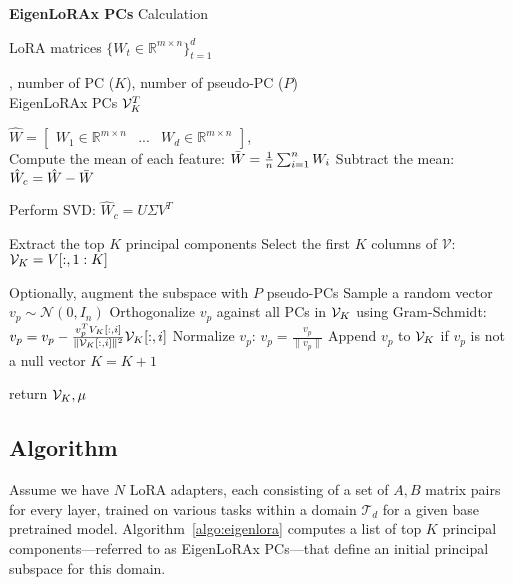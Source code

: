 \begin{algorithm}[!htb]
\caption{\textbf{EigenLoRAx PCs} Calculation}
\label{algo:eigenlora}
\begin{algorithmic}
    LoRA matrices 
    $\{W_t \in \mathbb{R}^{m \times n}\}_{t=1}^d$ 
    
     , number of PC ($K$), number of pseudo-PC ($P$)\\
    
     EigenLoRAx PCs $\mathcal{V}^T_{K}$

    \STATE $\hat{W} = \begin{bmatrix*} W_{1}\in \mathbb{R}^{m\times n} & \text{...} & W_{d}\in \mathbb{R}^{m\times n}\end{bmatrix*}$, \\
    
    \STATE Compute the mean of each feature: $ \Bar{W} = \frac{1}{n} \sum_{i=1}^{n} W_i $
    \STATE Subtract the mean: $ \hat{W}_c = \hat{W} - \Bar{W} $
    
   
    \STATE Perform SVD: $ \hat{W}_c = U \Sigma V^T $
    
    \STATE Extract the top $ K $ principal components
    \STATE Select the first $ K $ columns of $ \mathcal{V} $: $ \mathcal{V}_{K} = V[:, 1:K] $
    
    \STATE Optionally, augment the subspace with $P$ pseudo-PCs
        \STATE Sample a random vector $ v_p \sim \mathcal{N}(0, I_n) $  
        \STATE Orthogonalize $ v_p $ against all PCs in $ \mathcal{V}_{K} $ using Gram-Schmidt:
            \STATE $ v_p = v_p - \frac{v_p^T V_K[:, i]}{\|\mathcal{V}_{K}[:, i]\|^2} \mathcal{V}_{K}[:, i] $
        \ENDFOR
        \STATE Normalize $ v_p $: $ v_p = \frac{v_p}{\|v_p\|} $
        \STATE Append $ v_p $ to $ \mathcal{V}_{K} $ if $ v_p $ is not a null vector
        \STATE $K = K + 1$
    \ENDFOR

    \STATE return $\mathcal{V}_{K}, \mu$
    
\end{algorithmic}
\end{algorithm}

\subsection{Algorithm}
\label{sec:algo}

Assume we have $N$ LoRA adapters, each consisting of a set of $A, B$ matrix pairs for every layer, trained on various tasks within a domain $\mathcal{T}_d$ for a given base pretrained model. Algorithm~\ref{algo:eigenlora} computes a list of top $K$ principal components—referred to as EigenLoRAx PCs—that define an initial principal subspace for this domain. 

